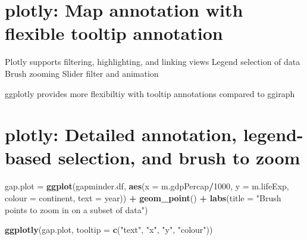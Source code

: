 \documentclass[]{krantz}
\makeatletter
\newenvironment{Shaded}{\begin{snugshade}}{\end{snugshade}}
\newcommand{\CommentTok}[1]{\textcolor[rgb]{0.56,0.35,0.01}{\textit{#1}}}
\newcommand{\DataTypeTok}[1]{\textcolor[rgb]{0.13,0.29,0.53}{#1}}
\newcommand{\DecValTok}[1]{\textcolor[rgb]{0.00,0.00,0.81}{#1}}
\newcommand{\KeywordTok}[1]{\textcolor[rgb]{0.13,0.29,0.53}{\textbf{#1}}}
\newcommand{\NormalTok}[1]{#1}
\newcommand{\OperatorTok}[1]{\textcolor[rgb]{0.81,0.36,0.00}{\textbf{#1}}}
\newcommand{\StringTok}[1]{\textcolor[rgb]{0.31,0.60,0.02}{#1}}
\newenvironment{kframe}{%
\medskip{}
\setlength{\fboxsep}{.8em}
 \def\at@end@of@kframe{}%
 \ifinner\ifhmode%
  \def\at@end@of@kframe{\end{minipage}}%
  \begin{minipage}{\columnwidth}%
 \fi\fi%
 \def\FrameCommand##1{\hskip\@totalleftmargin \hskip-\fboxsep
 \colorbox{shadecolor}{##1}\hskip-\fboxsep
     \hskip-\linewidth \hskip-\@totalleftmargin \hskip\columnwidth}%
 \MakeFramed {\advance\hsize-\width
   \@totalleftmargin\z@ \linewidth\hsize
   \@setminipage}}%
 {\par\unskip\endMakeFramed%
 \at@end@of@kframe}
\renewenvironment{Shaded}{\begin{kframe}}{\end{kframe}}
\makeatother
\begin{document}
\hypertarget{htmlwidget-bd96d7a906def74fcd78}{}

\hypertarget{plotly-map-annotation-with-flexible-tooltip-annotation}{%
\section{plotly: Map annotation with flexible tooltip annotation}\label{plotly-map-annotation-with-flexible-tooltip-annotation}}

Plotly supports filtering, highlighting, and linking views
Legend selection of data
Brush zooming
Slider filter and animation

ggplotly provides more flexibiltiy with tooltip annotations compared to ggiraph

\begin{Shaded}
\end{Shaded}

\hypertarget{plotly-detailed-annotation-legend-based-selection-and-brush-to-zoom}{%
\section{plotly: Detailed annotation, legend-based selection, and brush to zoom}\label{plotly-detailed-annotation-legend-based-selection-and-brush-to-zoom}}

\begin{Shaded}
\begin{Highlighting}[]
\NormalTok{gap.plot =}\StringTok{ }
\StringTok{  }\KeywordTok{ggplot}\NormalTok{(gapminder.df, }
         \KeywordTok{aes}\NormalTok{(}\DataTypeTok{x =}\NormalTok{ m.gdpPercap}\OperatorTok{/}\DecValTok{1000}\NormalTok{, }\DataTypeTok{y =}\NormalTok{ m.lifeExp, }\DataTypeTok{colour =}\NormalTok{ continent, }\DataTypeTok{text =}\NormalTok{ year)) }\OperatorTok{+}
\StringTok{  }\KeywordTok{geom_point}\NormalTok{() }\OperatorTok{+}
\StringTok{  }\KeywordTok{labs}\NormalTok{(}\DataTypeTok{title =} \StringTok{"Brush points to zoom in on a subset of data"}\NormalTok{)}

\KeywordTok{ggplotly}\NormalTok{(gap.plot, }\DataTypeTok{tooltip =} \KeywordTok{c}\NormalTok{(}\StringTok{"text"}\NormalTok{, }\StringTok{"x"}\NormalTok{, }\StringTok{"y"}\NormalTok{, }\StringTok{"colour"}\NormalTok{)) }
\end{Highlighting}
\end{Shaded}
\end{document}
